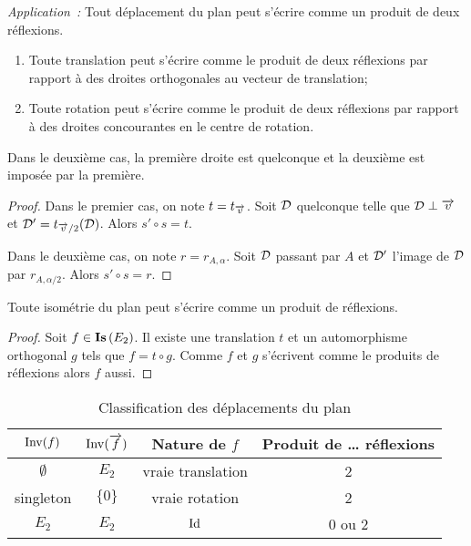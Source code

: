 \emph{Application~:} Tout déplacement du plan peut s'écrire comme un produit de 
deux réflexions.
\begin{enumerate}
  \item Toute translation peut s'écrire comme le produit de deux réflexions par 
    rapport à des droites orthogonales au vecteur de translation;
  \item Toute rotation peut s'écrire comme le produit de deux réflexions par 
    rapport à des droites concourantes en le centre de rotation.
\end{enumerate}

Dans le deuxième cas, la première droite est quelconque et la deuxième est 
imposée par la première.

\begin{proof}
  Dans le premier cas, on note \(t=t_{\overrightarrow{v}}\). Soit \(\mathcal{D}\) quelconque telle que 
  \(\mathcal{D} \perp \overrightarrow{v}\) et \(\mathcal{D}'=t_{\overrightarrow{v}/2}(\mathcal{D})\). Alors \(s'\circ s=t\).

  Dans le deuxième cas, on note \(r=r_{A, \alpha}\). Soit \(\mathcal{D}\) passant par 
  \(A\) et \(\mathcal{D}'\) l'image de \(\mathcal{D}\) par \(r_{A,\alpha/2}\). Alors \(s'\circ 
  s=r\).
\end{proof}

\begin{cor}
  Toute isométrie du plan peut s'écrire comme un produit de réflexions.
\end{cor}
\begin{proof}
  Soit \(f \in \mathbf{Is}\left(E_2\right)\). Il existe une translation \(t\) et un automorphisme 
  orthogonal \(g\) tels que \(f=t \circ g\). Comme \(f\) et \(g\) s'écrivent 
  comme le produits de réflexions alors \(f\) aussi.
\end{proof}

\begin{table}
  \centering
  \begin{tabular}{|c|c|c|c|}\hline
    \(\operatorname{Inv}(f)\) & \(\operatorname{Inv}(\overrightarrow{f})\) & Nature de \(f\) & Produit de \ldots 
    réflexions \\ \hline
    \(\emptyset\) & \(E_2\) & vraie translation & 2 \\
    singleton & \(\{0\}\)& vraie rotation & 2 \\
    \(E_2\) & \(E_2\) & \(\operatorname{Id}\) & 0 ou 2 \\ \hline
  \end{tabular}
  \caption{Classification des déplacements du plan}
  \label{tab:classdéplacementsplan}
\end{table}

